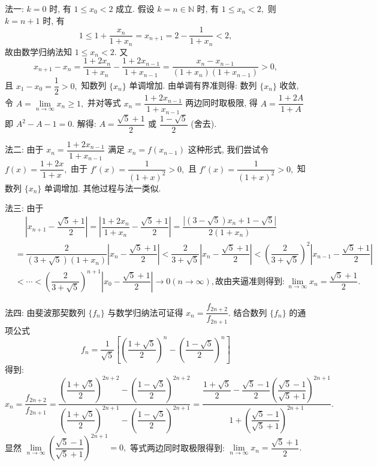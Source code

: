 \documentclass[lang=cn,12pt]{elegantbook}
\begin{document}
\begin{solution}
  法一: $k=0$ 时, 有 $1 \leqslant x_{0} < 2$ 成立.
  假设 $k=n\in \mathbb{N}$ 时, 有 $1 \leqslant x_{n} < 2,$ 则
  $k=n+1$ 时, 有 
    $$1 \leqslant 1+\dfrac{x_{n}}{1+x_{n}} = x_{n+1} = 2-\dfrac{1}{1+x_{n}} < 2,$$
  故由数学归纳法知 $1 \leqslant x_{n} < 2.$ 又 
  $$ x_{n+1} - x_{n}
    =\dfrac{1+2x_{n}}{1+x_{n}} - \dfrac{1+2x_{n-1}}{1+x_{n-1}}
    =\dfrac{x_{n}-x_{n-1}}{\left(1+x_{n}\right)\left(1+x_{n-1}\right)}>0,$$
  且 $x_{1}-x_{0} = \dfrac{1}{2} > 0,$ 知数列 $\{x_{n}\}$ 单调增加. 由单调有界准则得:
  数列 $\{x_{n}\}$ 收敛, 令 $A=\lim\limits_{n\to\infty} x_{n}\geqslant 1,$ 并对等式
  $x_{n} = \dfrac{1+2x_{n-1}}{1+x_{n-1}}$ 两边同时取极限, 得 $A=\dfrac{1+2A}{1+A}$
  即 $A^2-A-1=0.$ 解得: $A = \dfrac{\sqrt{5} + 1}{2}$ 或 
  $\dfrac{1-\sqrt{5}}{2}$ (舍去).
  \vspace{6pt}

  法二: 由于 $x_{n} = \dfrac{1+2x_{n-1}}{1+x_{n-1}}$ 满足 $x_{n} = f(x_{n-1})$
  这种形式, 我们尝试令 $f(x) = \dfrac{1+2x}{1+x},$ 由于
  $f'(x) = \dfrac{1}{(1+x)^2} > 0,$ 且  $f'(x) = \dfrac{1}{(1+x)^2} > 0,$ 知
  数列 $\{x_{n}\}$ 单调增加. 其他过程与法一类似.
  \vspace{6pt}

  法三: 由于 $$\begin{aligned} &\quad\ 
    \left| x_{n+1} - \dfrac{\sqrt{5}+1}{2} \right| = 
    \left| \dfrac{1+2x_{n}}{1+x_{n}} - \dfrac{\sqrt{5}+1}{2} \right| =
    \dfrac{\left|\left(3-\sqrt{5}\right)x_{n}+1-\sqrt{5}\right|}{2\left(1+x_{n}\right)} \\ &=
    \dfrac{2}{(3+\sqrt{5})\left(1+x_{n}\right)}\left|x_{n}-\dfrac{\sqrt{5}+1}{2}\right| <
    \dfrac{2}{3+\sqrt{5}}\left|x_{n}-\dfrac{\sqrt{5}+1}{2}\right| <
    \left(\dfrac{2}{3+\sqrt{5}}\right)^2\left|x_{n-1}-\dfrac{\sqrt{5}+1}{2}\right| \\ & < \cdots <
    \left(\dfrac{2}{3+\sqrt{5}}\right)^{n+1}\left|x_{0}-\dfrac{\sqrt{5}+1}{2}\right| \to 0 (n\to\infty)
    , \text{故由夹逼准则得到}: \lim\limits_{n\to\infty} x_{n} = \dfrac{\sqrt{5}+1}{2} .
    \end{aligned}$$
  \vspace{6pt}

  法四: 由斐波那契数列 $\{f_{n}\}$ 与数学归纳法可证得 
  $x_{n} = \dfrac{f_{2n+2}}{f_{2n+1}}.$
  结合数列 $\{f_{n}\}$ 的通项公式 $$f_{n} = 
    \dfrac{1}{\sqrt{5}}\left[\left(\dfrac{1+\sqrt{5}}{2}\right)^n-
      \left(\dfrac{1-\sqrt{5}}{2}\right)^n\right]$$ 得到:
  $$x_{n} = \dfrac{f_{2n+2}}{f_{2n+1}}=
    \dfrac{\left(\dfrac{1+\sqrt{5}}{2}\right)^{2n+2}-
      \left(\dfrac{1-\sqrt{5}}{2}\right)^{2n+2}}{
        \left(\dfrac{1+\sqrt{5}}{2}\right)^{2n+1}-
          \left(\dfrac{1-\sqrt{5}}{2}\right)^{2n+1}}=
    \dfrac{\dfrac{1+\sqrt{5}}{2}-\dfrac{\sqrt{5}-1}{2}
      \left(\dfrac{\sqrt{5}-1}{\sqrt{5}+1}\right)^{2n+1}}{
        1+\left(\dfrac{\sqrt{5}-1}{\sqrt{5}+1}\right)^{2n+1}}.$$
  显然 $\lim\limits_{n\to\infty} \left(\dfrac{\sqrt{5}-1}{\sqrt{5}+1}\right)^{2n+1} = 0,$
  等式两边同时取极限得到: $\lim\limits_{n\to\infty} x_{n} = \dfrac{\sqrt{5}+1}{2}.$
\end{solution}
\end{document}

